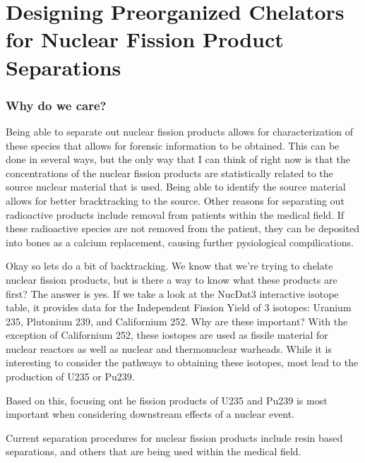 \section{Designing Preorganized Chelators for Nuclear Fission Product Separations}

\begin{frame}
\sectionpage
\end{frame}

\begin{frame}
\frametitle{Why do we care?}
Being able to separate out nuclear fission products allows for characterization of these species
that allows for forensic information to be obtained. This can be done in several ways, but the only
way that I can think of right now is that the concentrations of the nuclear fission products are
statistically related to the source nuclear material that is used. Being able to identify the source
material allows for better bracktracking to the source. Other reasons for separating out radioactive
products include removal from patients within the medical field. If these radioactive species are
not removed from the patient, they can be deposited into bones as a calcium replacement, causing
further pysiological compilications.
\end{frame}

\begin{frame}
Okay so lets do a bit of backtracking. We know that we're trying to chelate nuclear fission
products, but is there a way to know what these products are first? The answer is yes. If
we take a look at the NucDat3 interactive isotope table, it provides data for the
Independent Fission Yield of 3 isotopes: Uranium 235, Plutonium 239, and Californium 252.
Why are these important? With the exception of Californium 252, these iostopes are used
as fissile material for nuclear reactors as well as nuclear and thermonuclear warheads.
While it is interesting to consider the pathways to obtaining these isotopes, most lead
to the production of U235 or Pu239.
\end{frame}

\begin{frame}
Based on this, focusing ont he fission products of U235 and Pu239 is most important when
considering downstream effects of a nuclear event.
\end{frame}

\begin{frame}
Current separation procedures for nuclear fission products include resin based separations, and
others that are being used within the medical field.
\end{frame}

